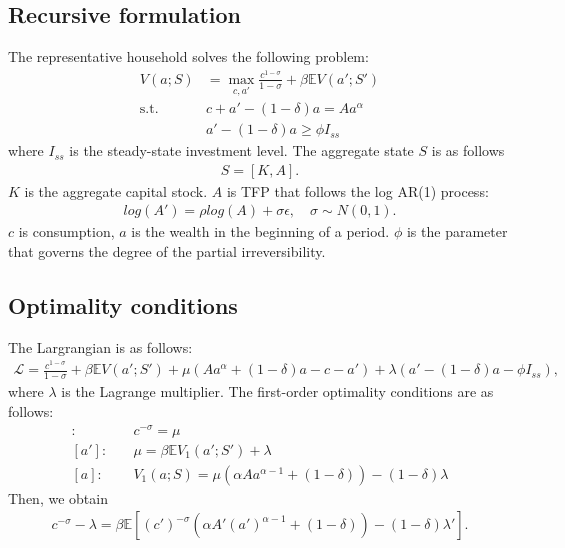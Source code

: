 \subsection*{Recursive formulation}
The representative household solves the following problem:
\begin{align*}
  V(a;S) &= \max_{c,a'} \frac{c^{1-\sigma}}{1-\sigma} + \beta \mathbb{E}V(a';S')
  \\
  \text{s.t. }& 
  c+a' - (1-\delta)a = Aa^{\alpha}
  \\
  &
  a' - (1-\delta)a \geq \phi I_{ss}
\end{align*}
where $I_{ss}$ is the steady-state investment level. The aggregate state $S$ is as follows
\begin{align*}
  S = [K,A].
\end{align*}
$K$ is the aggregate capital stock. $A$ is TFP that follows the log AR(1) process:
\begin{align*}
  log(A') = \rho log(A) + \sigma\epsilon,\quad\sigma\sim N(0,1).
\end{align*}
$c$ is consumption, $a$ is the wealth in the beginning of a period. $\phi$ is the parameter that governs the degree of the partial irreversibility.
\subsection*{Optimality conditions}
The Largrangian is as follows:
\begin{align*}
  \mathcal{L} = \frac{c^{1-\sigma}}{1-\sigma} + \beta \mathbb{E}V(a';S') + \mu(Aa^{\alpha} + (1-\delta)a- c-a' ) + \lambda(a' - (1-\delta)a - \phi I_{ss}),
\end{align*}
where $\lambda$ is the Lagrange multiplier.
The first-order optimality conditions are as follows:
\begin{align*}
  [c]:&\quad c^{-\sigma} = \mu
  \\
  [a']:&\quad \mu = \beta \mathbb{E}V_{1}(a';S') + \lambda
  \\
  [a]:&\quad V_{1}(a;S) = \mu(\alpha A a^{\alpha-1} + (1-\delta)) - (1-\delta)\lambda
\end{align*}
Then, we obtain
\begin{align*}
  c^{-\sigma} -\lambda= \beta \mathbb{E}\left[(c')^{-\sigma}(\alpha A' (a')^{\alpha-1}+(1-\delta)) -(1-\delta)\lambda'\right].
\end{align*}
